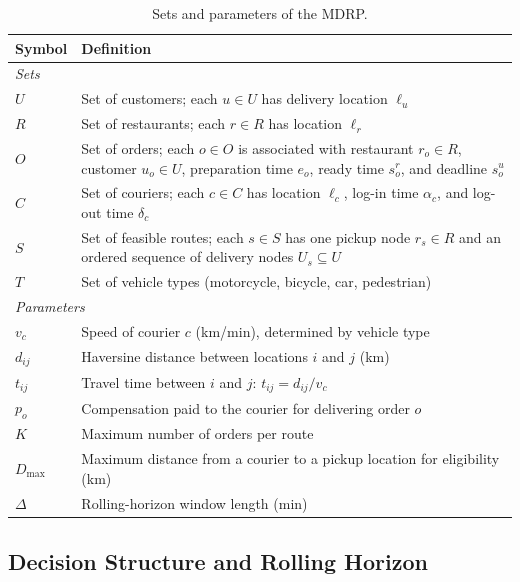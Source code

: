 \begin{table}[ht]
\centering
\caption{Sets and parameters of the MDRP.}
\label{tab:notation}
\small
\setlength{\tabcolsep}{5pt}
\begin{tabular}{lp{9.5cm}}
\toprule
\textbf{Symbol} & \textbf{Definition} \\
\midrule
\multicolumn{2}{l}{\textit{Sets}} \\
$U$   & Set of customers; each $u \in U$ has delivery location $\ell_u$ \\
$R$   & Set of restaurants; each $r \in R$ has location $\ell_r$ \\
$O$   & Set of orders; each $o \in O$ is associated with restaurant $r_o \in R$,
        customer $u_o \in U$, preparation time $e_o$, ready time $s^r_o$,
        and deadline $s^u_o$ \\
$C$   & Set of couriers; each $c \in C$ has location $\ell_c$,
        log-in time $\alpha_c$, and log-out time $\delta_c$ \\
$S$   & Set of feasible routes; each $s \in S$ has one pickup node
        $r_s \in R$ and an ordered sequence of delivery nodes
        $U_s \subseteq U$ \\
$T$   & Set of vehicle types
        (motorcycle, bicycle, car, pedestrian) \\
\midrule
\multicolumn{2}{l}{\textit{Parameters}} \\
$v_c$             & Speed of courier $c$ (km/min), determined by vehicle type \\
$d_{ij}$          & Haversine distance between locations $i$ and $j$ (km) \\
$t_{ij}$          & Travel time between $i$ and $j$: $t_{ij} = d_{ij}/v_c$ \\
$p_o$             & Compensation paid to the courier for delivering order $o$ \\
$K$               & Maximum number of orders per route \\
$D_{\max}$        & Maximum distance from a courier to a pickup location for
                    eligibility (km) \\
$\Delta$          & Rolling-horizon window length (min) \\
\bottomrule
\end{tabular}
\end{table}

\subsection{Decision Structure and Rolling Horizon}\label{subsec:decisions}

